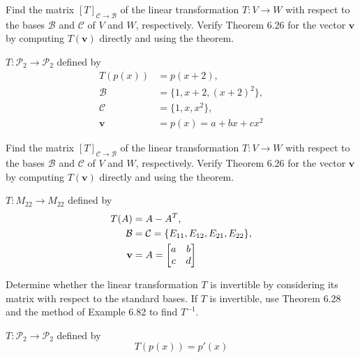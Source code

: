\documentclass[boxes]{gsypset}
\begin{document}
\begin{problem}[6.6.4]
	Find the matrix $[T]_{\mathcal{C}\to \mathcal{B}}$ of the linear transformation $T:V\to W$
	with respect to the bases $\mathcal{B}$ and $\mathcal{C}$ of $V$ and $W$, respectively. 
	Verify Theorem 6.26 for the vector $\mathbf{v}$ by computing 
	$T(\mathbf{v})$ directly and using the theorem.
	
	$T: \mathscr{P}_2 \to \mathscr{P}_2$ defined by
	\begin{align*}
		T(p(x)) &= p(x+2),\\
		\mathcal{B} &= \{1,x+2,(x+2)^2\},\\
		\mathcal{C} &= \{1,x,x^2\},\\
		\mathbf{v} &= p(x)=a+bx+cx^2
	\end{align*}
\end{problem}
\begin{solution}
	
\end{solution}

\begin{problem}[6.6.12]
	Find the matrix $[T]_{\mathcal{C}\to \mathcal{B}}$ of the linear transformation $T:V\to W$
	with respect to the bases $\mathcal{B}$ and $\mathcal{C}$ of $V$ and $W$, respectively. 
	Verify Theorem 6.26 for the vector $\mathbf{v}$ by computing 
	$T(\mathbf{v})$ directly and using the theorem.
	
	$T: M_{22} \to M_{22}$ defined by
	\begin{align*}
		T(A) &= A - A^T, \\
		\mathcal{B} &= \mathcal{C} = \{E_{11},E_{12},E_{21},E_{22}\}, \\
		\mathbf{v} &= A = \begin{bmatrix}a&b\\c&d\end{bmatrix}
	\end{align*}
\end{problem}
\begin{solution}
	
\end{solution}

\begin{problem}[6.6.22]
	Determine whether the linear transformation $T$ is invertible 
	by considering its matrix with respect to the standard bases. 
	If $T$ is invertible, use Theorem 6.28 and the method of Example 6.82 to find $T^{-1}$.
	
	$T: \mathscr{P}_2 \to \mathscr{P}_2$ defined by
	\[
		T(p(x)) = p'(x)
	\]
\end{problem}
\begin{solution}
	
\end{solution}
\end{document}
